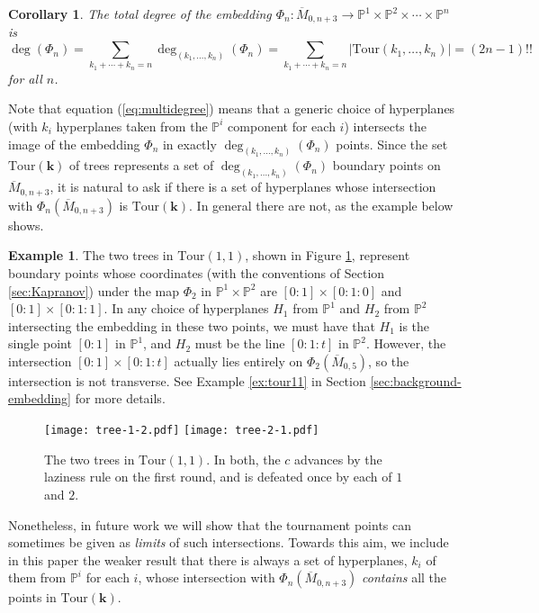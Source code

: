 \documentclass[11pt]{amsart}
\newcommand{\Mbar}{\overline{M}}
\newcommand{\PP}{\mathbb{P}}
\newcommand{\emb}{\Phi}
\newcommand{\Tour}{\mathrm{Tour}}
\newtheorem{corollary}[thm]{Corollary}
\numberwithin{thm}{section}
\numberwithin{equation}{section}
\numberwithin{figure}{section}
\theoremstyle{definition}
\newtheorem{example}[thm]{Example}
\begin{document}
\begin{corollary}\label{cor:total-degree}
  The total degree of the embedding $\emb_n:\Mbar_{0,n+3}\to \PP^1\times \PP^2 \times \cdots \times \PP^n$ is $$\deg(\emb_n)=\sum_{k_1+\cdots+k_n=n}\deg_{(k_1,\ldots,k_n)}(\emb_n)=\sum_{k_1+\cdots+k_n=n}|\Tour(k_1,\ldots,k_n)|=(2n-1)!!$$ for all $n$.
\end{corollary}

Note that equation (\ref{eq:multidegree}) means that a generic choice of hyperplanes (with $k_i$ hyperplanes taken from the $\PP^i$ component for each $i$) intersects the image of the embedding $\emb_n$ in exactly $\deg_{(k_1,\ldots,k_n)}(\emb_n)$ points.   Since the set $\Tour(\mathbf{k})$ of trees represents a set of $\deg_{(k_1,\ldots,k_n)}(\emb_n)$ boundary points on $\Mbar_{0,n+3}$, it is natural to ask if there is a set of hyperplanes whose intersection with $\emb_n(\Mbar_{0,n+3})$ is $\Tour(\mathbf{k})$. In general there are not, as the example below shows.

\begin{example}\label{ex:intro}
The two trees in $\Tour(1,1)$, shown in Figure \ref{fig:tour11}, represent boundary points whose coordinates (with the conventions of Section \ref{sec:Kapranov}) under the map $\emb_2$ in $\PP^1\times \PP^2$ are ${[0:1]\times [0:1:0]}$ and ${[0:1]\times [0:1:1]}$. In any choice of hyperplanes $H_1$ from $\PP^1$ and $H_2$ from $\PP^2$ intersecting the embedding in these two points, we must have that $H_1$ is the single point $[0:1]$ in $\PP^1$, and $H_2$ must be the line $[0:1:t]$ in $\PP^2$.  However, the intersection $[0:1] \times [0:1:t]$ actually lies entirely on $\emb_2(\Mbar_{0,5})$, so the intersection is not transverse.  See Example \ref{ex:tour11} in Section \ref{sec:background-embedding} for more details.
\end{example}

\begin{figure}
    \centering
    \texttt{[image: tree-1-2.pdf]} \hspace{2cm} \texttt{[image: tree-2-1.pdf]}
    \caption{The two trees in $\Tour(1,1)$.  In both, the $c$ advances by the laziness rule on the first round, and is defeated once by each of $1$ and $2$.}
    \label{fig:tour11}
\end{figure}

Nonetheless, in future work we will show that the tournament points can sometimes be given as \textit{limits} of such intersections.  Towards this aim, we include in this paper the weaker result that there is always a set of hyperplanes, $k_i$ of them from $\PP^i$ for each $i$, whose intersection with $\emb_n(\Mbar_{0,n+3})$ \textit{contains} all the points in $\Tour(\mathbf{k})$.
\end{document}
